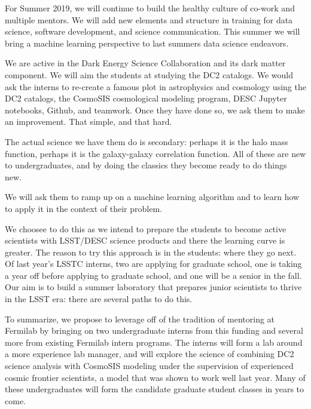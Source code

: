 For Summer 2019, we will continue to build the healthy culture of co-work and multiple mentors. 
We will add new elements and structure in training for data science, software development, and science communication.
This summer we will bring a machine learning perspective to last summers
data science endeavors. 

\newpage

We are active in the Dark Energy Science Collaboration and its dark matter component.
We will aim the students at studying the DC2 catalogs. We would ask
the interns to re-create a famous plot in astrophysics and cosmology using
the DC2 catalogs, the CosmoSIS cosmological modeling program,
DESC Jupyter notebooks, Github, and teamwork. Once they have done so,
we ask them to make an improvement. That simple, and that hard.

The actual science we have them do is secondary: perhaps it is the
halo mass function, perhaps it is the galaxy-galaxy correlation function.
All of these are new to undergraduates, and by doing the classics they
become ready to do things new.

We will ask them to ramp up on a machine learning algorithm and
to learn how to apply it in the context of their problem.

We choosee to do this
as we intend to prepare the students to become active scientists
with LSST/DESC science products and there the learning curve is greater.
The reason to try this approach is in the students: where they go next.
Of last year's LSSTC interns, two are applying for graduate school,
one is taking a year off before applying to graduate school, and one
will be a senior in the fall.
Our aim is to build a summer laboratory 
that prepares junior scientists to thrive in the LSST era: there
are several paths to do this. 

To summarize, we  propose to leverage off of the tradition 
of mentoring at Fermilab by
bringing on two undergraduate interns from this funding
and several more from existing Fermilab intern programs.
The interns will form a lab around a more experience
lab manager, and will explore the science
of combining DC2 science analysis with CosmoSIS modeling
under the supervision of experienced cosmic
frontier scientists, a model that was shown to work
well last year. Many of these  undergraduates will
form the candidate graduate student classes in years to come.

